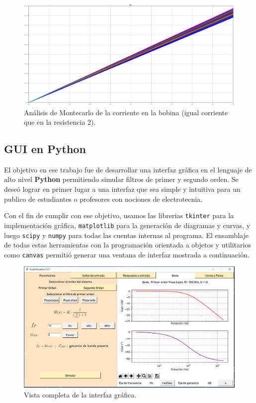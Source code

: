 \documentclass[a4paper]{article}
\begin{document}
\begin{figure}[H]
	\centering
	\includegraphics[width=\textwidth]{LTSpice-MC1-IL}
	\caption{Análisis de Montecarlo de la corriente en la bobina (igual corriente que en la resistencia 2).}
	\label{fig:LTSMCIL}
\end{figure}

\subsection*{GUI en Python}

El objetivo en ese trabajo fue de desarrollar una interfaz gráfica en el lenguaje de alto nivel \textbf{Python} permitiendo simular filtros de primer y segundo orden. Se deseó lograr en primer lugar a una interfaz que sea simple y intuitiva para un publico de estudiantes o profesores con nociones de electrotecnia.

\vspace{1em}

Con el fin de cumplir con ese objetivo, usamos las librerias \texttt{tkinter} para la implementación gráfica, \texttt{matplotlib} para la generación de diagramas y curvas, y luego \texttt{scipy} y \texttt{numpy} para todas las cuentas internas al programa. El ensamblaje de todas estas herramientas con la programación orientada a objetos y utilitarios como \texttt{canvas} permitió generar una ventana de interfaz mostrada a continuación.

\begin{figure}[h]
\begin{center}
\includegraphics[scale=0.35]{PantallaUI}
\caption{Vista completa de la interfaz gráfica.}
\end{center}
\end{figure}
\end{document}
